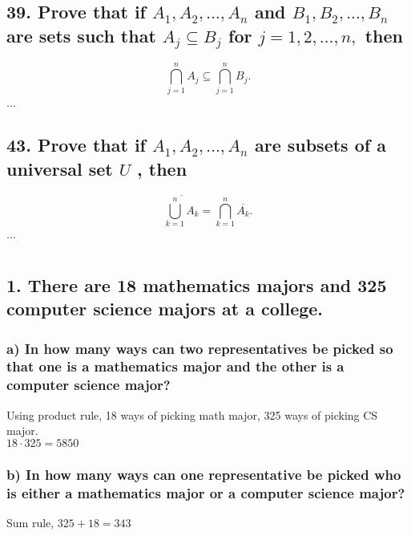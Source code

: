\documentclass[11pt, oneside]{article} %
\numberwithin{equation}{section} %
\numberwithin{figure}{section} %
\numberwithin{table}{section} %
\begin{document}
\subsection{39. Prove that if $A_1,A_2,...,A_n$ and $B_1,B_2,...,B_n$ are sets such that $A_j \subseteq B_j$ for $j = 1,2,...,n,$ then}
\begin{displaymath}
 \displaystyle\bigcap^n_{j = 1} A_j \subseteq \bigcap^n_{j = 1} B_j.
\end{displaymath}
...
\subsection{43. Prove that if $A_1, A_2,..., A_n$ are subsets of a universal set $U$ , then}
\begin{displaymath}
 \displaystyle\overline{\bigcup^n_{k = 1} A_k} = \bigcap^n_{k = 1} \overline{A_k}.
\end{displaymath}
...


\section{}
\subsection{1. There are 18 mathematics majors and 325 computer science majors at a college.}
\subsubsection{a) In how many ways can two representatives be picked so that one is a mathematics major and the other is a computer science major?}
Using product rule, 18 ways of picking math major, 325 ways of picking CS major. \\
$18 \cdot 325 = 5850$

\subsubsection{b) In how many ways can one representative be picked who is either a mathematics major or a computer science major?}
Sum rule, $325 + 18 = 343$

\end{document}
